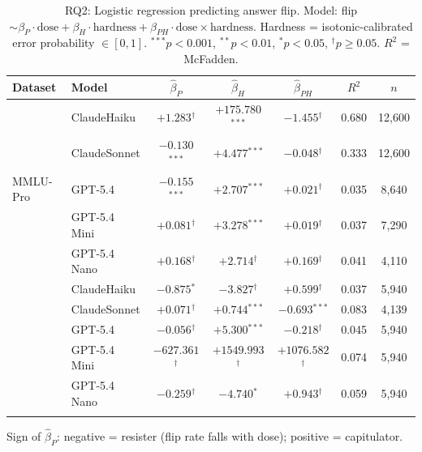 \begin{table}[t]
\centering
\caption{RQ2: Logistic regression predicting answer flip.
  Model: flip $\sim \beta_P \cdot \text{dose} + \beta_H \cdot \text{hardness} + \beta_{PH} \cdot \text{dose}\times\text{hardness}$.
  Hardness = isotonic-calibrated error probability $\in[0,1]$.
  $^{***}p{<}0.001$, $^{**}p{<}0.01$, $^{*}p{<}0.05$, $^\dagger p{\geq}0.05$. $R^2$ = McFadden.}
\label{tab:rq2v2}
\small
\begin{tabular}{llccccc}
\toprule
\textbf{Dataset} & \textbf{Model} & $\hat\beta_P$ & $\hat\beta_H$ & $\hat\beta_{PH}$ & $R^2$ & $n$ \\
\midrule
\multirow{5}{*}{MMLU-Pro} & ClaudeHaiku & $+1.283$$^\dagger$ & $+175.780$$^{***}$ & $-1.455$$^\dagger$ & 0.680 & 12,600 \\
 & ClaudeSonnet & $-0.130$$^{***}$ & $+4.477$$^{***}$ & $-0.048$$^\dagger$ & 0.333 & 12,600 \\
 & GPT-5.4 & $-0.155$$^{***}$ & $+2.707$$^{***}$ & $+0.021$$^\dagger$ & 0.035 & 8,640 \\
 & GPT-5.4 Mini & $+0.081$$^\dagger$ & $+3.278$$^{***}$ & $+0.019$$^\dagger$ & 0.037 & 7,290 \\
 & GPT-5.4 Nano & $+0.168$$^\dagger$ & $+2.714$$^\dagger$ & $+0.169$$^\dagger$ & 0.041 & 4,110 \\
\addlinespace
\multirow{5}{*}{GPQA-Diamond} & ClaudeHaiku & $-0.875$$^{*}$ & $-3.827$$^\dagger$ & $+0.599$$^\dagger$ & 0.037 & 5,940 \\
 & ClaudeSonnet & $+0.071$$^\dagger$ & $+0.744$$^{***}$ & $-0.693$$^{***}$ & 0.083 & 4,139 \\
 & GPT-5.4 & $-0.056$$^\dagger$ & $+5.300$$^{***}$ & $-0.218$$^\dagger$ & 0.045 & 5,940 \\
 & GPT-5.4 Mini & $-627.361$$^\dagger$ & $+1549.993$$^\dagger$ & $+1076.582$$^\dagger$ & 0.074 & 5,940 \\
 & GPT-5.4 Nano & $-0.259$$^\dagger$ & $-4.740$$^{*}$ & $+0.943$$^\dagger$ & 0.059 & 5,940 \\
\addlinespace
\bottomrule
\end{tabular}
{\footnotesize Sign of $\hat\beta_P$: negative = resister (flip rate falls with dose); positive = capitulator.}
\end{table}

